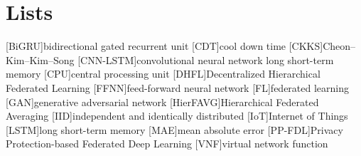\appendix
\renewcommand{\appendixtocname}{Appendix}
\renewcommand{\appendixpagename}{\appendixtocname}
\addappheadtotoc
{}
\appendixpage

\chapter{Lists}
\begin{acronym}[\hspace{3cm}]
  [BiGRU]{bidirectional gated recurrent unit}
  [CDT]{cool down time}
  [CKKS]{Cheon--Kim--Kim--Song}
  [CNN-LSTM]{convolutional neural network long short-term memory}
  [CPU]{central processing unit}
  [DHFL]{Decentralized Hierarchical Federated Learning}
  [FFNN]{feed-forward neural network}
  [FL]{federated learning}
  [GAN]{generative adversarial network}
  [HierFAVG]{Hierarchical Federated Averaging}
  [IID]{independent and identically distributed}
  [IoT]{Internet of Things}
  [LSTM]{long short-term memory}
  [MAE]{mean absolute error}
  [PP-FDL]{Privacy Protection-based Federated Deep Learning}
  [VNF]{virtual network function}
\end{acronym}
\clearpage
\listoffigures
{}
